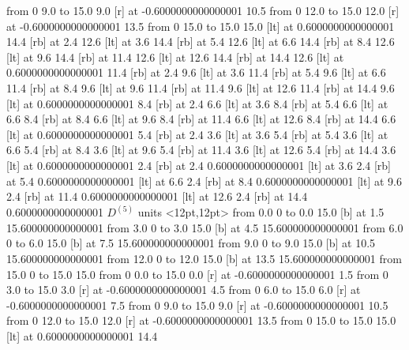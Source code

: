   \putrule from 0 9.0 to 15.0 9.0
   [r] at -0.6000000000000001 10.5
  \putrule from 0 12.0 to 15.0 12.0
   [r] at -0.6000000000000001 13.5
  \putrule from 0 15.0 to 15.0 15.0
 [lt] at 0.6000000000000001 14.4
 [rb] at 2.4 12.6
 [lt] at 3.6 14.4
 [rb] at 5.4 12.6
 [lt] at 6.6 14.4
 [rb] at 8.4 12.6
 [lt] at 9.6 14.4
 [rb] at 11.4 12.6
 [lt] at 12.6 14.4
 [rb] at 14.4 12.6
 [lt] at 0.6000000000000001 11.4
 [rb] at 2.4 9.6
 [lt] at 3.6 11.4
 [rb] at 5.4 9.6
 [lt] at 6.6 11.4
 [rb] at 8.4 9.6
 [lt] at 9.6 11.4
 [rb] at 11.4 9.6
 [lt] at 12.6 11.4
 [rb] at 14.4 9.6
 [lt] at 0.6000000000000001 8.4
 [rb] at 2.4 6.6
 [lt] at 3.6 8.4
 [rb] at 5.4 6.6
 [lt] at 6.6 8.4
 [rb] at 8.4 6.6
 [lt] at 9.6 8.4
 [rb] at 11.4 6.6
 [lt] at 12.6 8.4
 [rb] at 14.4 6.6
 [lt] at 0.6000000000000001 5.4
 [rb] at 2.4 3.6
 [lt] at 3.6 5.4
 [rb] at 5.4 3.6
 [lt] at 6.6 5.4
 [rb] at 8.4 3.6
 [lt] at 9.6 5.4
 [rb] at 11.4 3.6
 [lt] at 12.6 5.4
 [rb] at 14.4 3.6
 [lt] at 0.6000000000000001 2.4
 [rb] at 2.4 0.6000000000000001
 [lt] at 3.6 2.4
 [rb] at 5.4 0.6000000000000001
 [lt] at 6.6 2.4
 [rb] at 8.4 0.6000000000000001
 [lt] at 9.6 2.4
 [rb] at 11.4 0.6000000000000001
 [lt] at 12.6 2.4
 [rb] at 14.4 0.6000000000000001
\endpicture
\bigskip
\vfil\eject
$\displaystyle D^{(5)}$
\bigskip
\beginpicture
\setcoordinatesystem units <12pt,12pt>
  \putrule from 0.0 0 to 0.0  15.0 
  [b] at 1.5 15.600000000000001
  \putrule from 3.0 0 to 3.0  15.0 
  [b] at 4.5 15.600000000000001
  \putrule from 6.0 0 to 6.0  15.0 
  [b] at 7.5 15.600000000000001
  \putrule from 9.0 0 to 9.0  15.0 
  [b] at 10.5 15.600000000000001
  \putrule from 12.0 0 to 12.0  15.0 
  [b] at 13.5 15.600000000000001
  \putrule from 15.0 0 to 15.0  15.0 
  \putrule from 0 0.0 to 15.0 0.0
   [r] at -0.6000000000000001 1.5
  \putrule from 0 3.0 to 15.0 3.0
   [r] at -0.6000000000000001 4.5
  \putrule from 0 6.0 to 15.0 6.0
   [r] at -0.6000000000000001 7.5
  \putrule from 0 9.0 to 15.0 9.0
   [r] at -0.6000000000000001 10.5
  \putrule from 0 12.0 to 15.0 12.0
   [r] at -0.6000000000000001 13.5
  \putrule from 0 15.0 to 15.0 15.0
 [lt] at 0.6000000000000001 14.4
